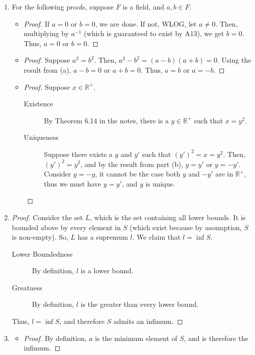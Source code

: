 \documentclass[12pt]{article}
\begin{document}
\begin{enumerate}[start = 1, label = {\bfseries Question \arabic*}, leftmargin=1in]
\item For the following proofs, suppose $F$ is a field, and $a,b\in F$. \begin{itemize}
    \item[(a)] \begin{proof}
    If $a=0$ or $b=0$, we are done. If not, WLOG, let $a\neq 0$. Then, multiplying by $a^{-1}$ (which is guaranteed to exist by A13), we get $b=0$. Thus, $a=0$ or $b=0$. \end{proof}
    \item[(b)]\begin{proof}Suppose $a^2=b^2$. Then, $a^2-b^2=(a-b)(a+b)=0$. Using the result from (a), $a-b=0$ or $a+b=0$. Thus, $a=b$ or $a=-b$.\end{proof}
    \item[(c)] \begin{proof}Suppose $x\in \mathbb{R}^{+}$. \begin{description}
    \item[Existence] By Theorem 6.14 in the notes, there is a $y\in \mathbb{R}^{+}$ such that $x=y^2$.
    \item[Uniqueness] Suppose there exists a $y$ and $y'$ such that ${(y')}^2=x = y^2$. Then, ${(y')}^2=y^2$, and by the result from part (b), $y=y'$ or $y=-y'$. Consider $y=-y$, it cannot be the case both $y$ and $-y'$ are in $\mathbb{R}^{+}$, thus we must have $y=y'$, and $y$ is unique.
    \end{description}
    \end{proof}
\end{itemize}
\item\begin{proof}
    Consider the set $L$, which is the set containing all lower bounds. It is bounded above by every element in $S$ (which exist because by assumption, $S$ is non-empty). So, $L$ has a supremum $l$.
    We claim that $l=\inf S$.\begin{description}
        \item[Lower Boundedness] By definition, $l$ is a lower bound.
        \item[Greatness] By definition, $l$ is the greater than every lower bound.
    \end{description} Thus, $l=\inf S$, and therefore $S$ admits an infimum.
\end{proof}
\item \begin{itemize}
    \item[(a)]\begin{proof}By definition, $a$ is the minimum element of $S$, and is therefore the infimum.


\end{proof}
\end{itemize}
\end{enumerate}
\end{document}
